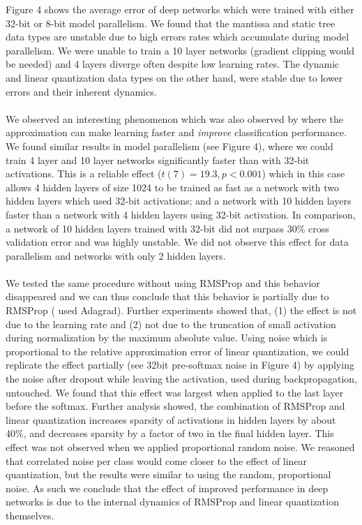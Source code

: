 \documentclass{article} %
\begin{document}
Figure 4 shows the average error of deep networks  which were trained with either 32-bit or 8-bit model parallelism. We found that the mantissa and static tree data types are unstable due to high errors rates which accumulate during model parallelism. We were unable to train a 10 layer networks (gradient clipping would be needed) and 4 layers diverge often despite low learning rates. The dynamic and linear quantization data types on the other hand, were stable due to lower errors and their inherent dynamics.\\\\
We observed an interesting phenomenon which was also observed by \citet{seide20141} where the approximation can make learning faster and {\it improve} classification performance. We found similar results in model parallelism (see Figure 4), where we could train 4 layer and 10 layer networks significantly faster than with 32-bit activations. This is a reliable effect ($t(7) = 19.3, p < 0.001$) which in this case allows 4 hidden layers of size 1024 to be trained as fast as a network with two hidden layers which used 32-bit activations; and a network with 10 hidden layers faster than a network with 4 hidden layers using 32-bit activation. In comparison, a network of 10 hidden layers trained with 32-bit did not surpass 30\% cross validation error and was highly unstable. We did not observe this effect for data parallelism and networks with only 2 hidden layers.\\\\
We tested the same procedure without using RMSProp and this behavior disappeared and we can thus conclude that this behavior is partially due to RMSProp (\citet{seide20141} used Adagrad). Further experiments showed that, (1) the effect is not due to the learning rate and (2) not due to the truncation of small activation during normalization by the maximum absolute value. Using noise which is proportional to the relative approximation error of linear quantization, we could replicate the effect partially (see 32bit pre-softmax noise in Figure 4) by applying the noise after dropout while leaving the activation, used during backpropagation, untouched. We found that this effect was largest when applied to the last layer before the softmax. Further analysis showed, the combination of RMSProp and linear quantization increases sparsity of activations in hidden layers by about 40\%, and decreases sparsity by a factor of two in the final hidden layer. This effect was not observed when we applied proportional random noise. We reasoned that correlated noise per class would come closer to the effect of linear quantization, but the results were similar to using the random, proportional noise. As such we conclude that the effect of improved performance in deep networks is due to the internal dynamics of RMSProp and linear quantization themselves.
\end{document}
